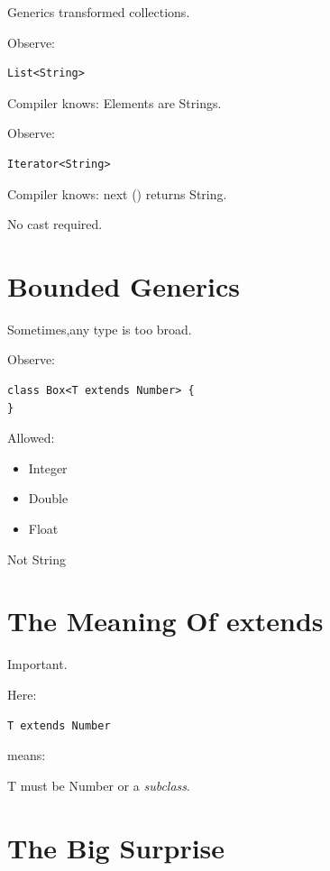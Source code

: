 \documentclass[11pt,a4paper]{book}
\begin{document}
Generics transformed collections.

Observe:

\begin{verbatim} 
List<String>
\end{verbatim}

Compiler knows: Elements are Strings.

Observe:

\begin{verbatim} 
Iterator<String>
\end{verbatim}

Compiler knows: next () returns String.

No cast required.

\section{Bounded Generics}

Sometimes,any type is too broad.

Observe:

\begin{verbatim} 
class Box<T extends Number> {
}
\end{verbatim}

Allowed:
\begin{itemize}
\item [-] \textcolor{RosettaJade}{Integer}
\item [-] \textcolor{RosettaJade}{Double}
\item [-] \textcolor{RosettaJade}{Float}
\end{itemize}
\textcolor{RosettaOrange}{Not} \textcolor{RosettaJade}{String}

\section{The Meaning Of extends}

Important.

Here:

\begin{verbatim} 
T extends Number
\end{verbatim}

means:

T must be \textcolor{RosettaJade}{Number}
or a \emph{subclass}.

\section{The Big Surprise}
\end{document}
